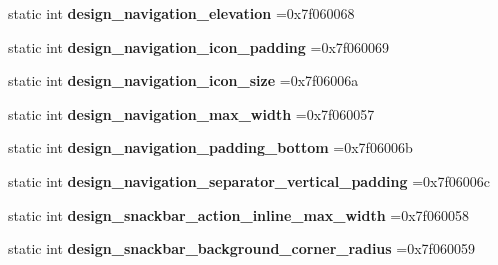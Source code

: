 \begin{DoxyCompactItemize}
static int {\bfseries design\+\_\+navigation\+\_\+elevation} =0x7f060068
\item 
\mbox{\label{classandroid_1_1support_1_1graphics_1_1drawable_1_1R_1_1dimen_a661426b9113f1029035b726cd16985fb}} 
static int {\bfseries design\+\_\+navigation\+\_\+icon\+\_\+padding} =0x7f060069
\item 
\mbox{\label{classandroid_1_1support_1_1graphics_1_1drawable_1_1R_1_1dimen_a92e3145b3177a2d0c378c1342d86f2d8}} 
static int {\bfseries design\+\_\+navigation\+\_\+icon\+\_\+size} =0x7f06006a
\item 
\mbox{\label{classandroid_1_1support_1_1graphics_1_1drawable_1_1R_1_1dimen_a50fc0b7b25fa71cef08019678808d61b}} 
static int {\bfseries design\+\_\+navigation\+\_\+max\+\_\+width} =0x7f060057
\item 
\mbox{\label{classandroid_1_1support_1_1graphics_1_1drawable_1_1R_1_1dimen_a085981918c5d4780d31cacb8a4100843}} 
static int {\bfseries design\+\_\+navigation\+\_\+padding\+\_\+bottom} =0x7f06006b
\item 
\mbox{\label{classandroid_1_1support_1_1graphics_1_1drawable_1_1R_1_1dimen_a97b9287c5c3bd43718af2f114739ffb9}} 
static int {\bfseries design\+\_\+navigation\+\_\+separator\+\_\+vertical\+\_\+padding} =0x7f06006c
\item 
\mbox{\label{classandroid_1_1support_1_1graphics_1_1drawable_1_1R_1_1dimen_aad32b402da3e25250f81f61be71613f4}} 
static int {\bfseries design\+\_\+snackbar\+\_\+action\+\_\+inline\+\_\+max\+\_\+width} =0x7f060058
\item 
\mbox{\label{classandroid_1_1support_1_1graphics_1_1drawable_1_1R_1_1dimen_abd6f0c81b0c2578fed1859665a107464}} 
static int {\bfseries design\+\_\+snackbar\+\_\+background\+\_\+corner\+\_\+radius} =0x7f060059
\item 

\end{DoxyCompactItemize}
